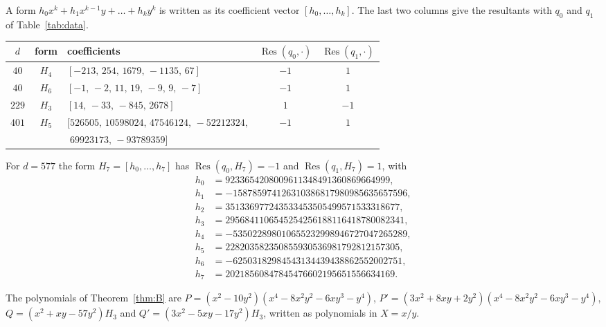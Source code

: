 \documentclass[11pt]{amsart}
\theoremstyle{definition}
\DeclareMathOperator{\Res}{Res}
\begin{document}
A form $h_0x^k+h_1x^{k-1}y+\dots+h_ky^k$ is written as its coefficient vector $[h_0,\dots,h_k]$. The last two columns give the resultants with $q_0$ and $q_1$ of Table~\ref{tab:data}.

\medskip
\begin{center}
\renewcommand{\arraystretch}{1.2}
\begin{tabular}{cclcc}
$d$ & form & coefficients & $\Res(q_0,\cdot)$ & $\Res(q_1,\cdot)$\\\hline
$40$ & $H_4$ & $[-213,\,254,\,1679,\,-1135,\,67]$ & $-1$ & $1$\\
$40$ & $H_6$ & $[-1,\,-2,\,11,\,19,\,-9,\,9,\,-7]$ & $-1$ & $1$\\
$229$ & $H_3$ & $[14,\,-33,\,-845,\,2678]$ & $1$ & $-1$\\
$401$ & $H_5$ & $[526505,\,10598024,\,47546124,\,-52212324,$ & $-1$ & $1$\\
 & & $\phantom{[}69923173,\,-93789359]$ & &
\end{tabular}
\end{center}

\medskip\noindent For $d=577$ the form $H_7=[h_0,\dots,h_7]$ has $\Res(q_0,H_7)=-1$ and $\Res(q_1,H_7)=1$, with
\begin{align*}
h_0&=9233654208009611348491360869664999,\\
h_1&=-158785974126310386817980985635657596,\\
h_2&=351336977243533453505499571533318677,\\
h_3&=2956841106545254256188116418780082341,\\
h_4&=-535022898010655232998946727047265289,\\
h_5&=228203582350855930536981792812157305,\\
h_6&=-62503182984543134439438862552002751,\\
h_7&=20218560847845476602195651556634169.
\end{align*}

\medskip\noindent The polynomials of Theorem~\ref{thm:B} are $P=(x^2-10y^2)(x^4-8x^2y^2-6xy^3-y^4)$, $P'=(3x^2+8xy+2y^2)(x^4-8x^2y^2-6xy^3-y^4)$, $Q=(x^2+xy-57y^2)H_3$ and $Q'=(3x^2-5xy-17y^2)H_3$, written as polynomials in $X=x/y$.
\end{document}
